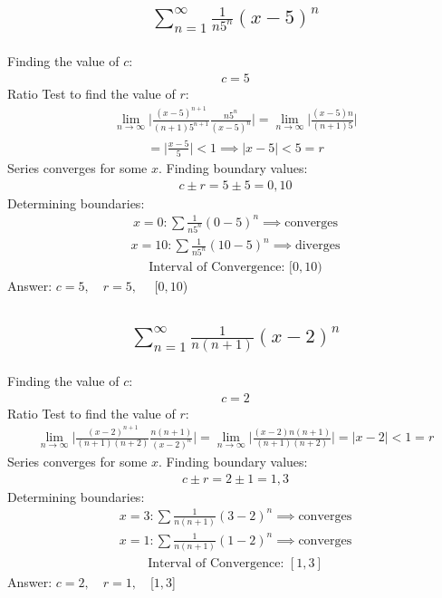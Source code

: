 \documentclass{article}
\begin{document}
\subsection{
	\begin{align*}
		\sum_{n = 1}^\infty \frac{1}{n 5^n} (x - 5)^n
	\end{align*}
}
Finding the value of $c$:
\begin{align*}
	c = 5
\end{align*}
Ratio Test to find the value of $r$:
\begin{align*}
	\lim_{n \to \infty} \bigg| \frac{(x - 5)^{n + 1}}{(n + 1) 5^{n + 1}} \frac{n 5^n}{(x - 5)^n} \bigg| = \lim_{n \to \infty} \bigg| \frac{(x - 5)n}{(n + 1)5} \bigg|
\end{align*}
\begin{align*}
	= \bigg| \frac{x - 5}{5} \bigg| < 1 \implies |x - 5| < 5 = r
\end{align*}
Series converges for some $x$. Finding boundary values:
\begin{align*}
	c \pm r = 5 \pm 5 = 0, 10
\end{align*}
Determining boundaries:
\begin{align*}
	x = 0: \sum \frac{1}{n 5^n} (0 - 5)^n \implies \text{converges}
\end{align*}
\begin{align*}
	x = 10: \sum \frac{1}{n 5^n} (10 - 5)^n \implies \text{diverges}
\end{align*}
\begin{align*}
	\text{Interval of Convergence: } [0, 10)
\end{align*}
Answer: $c = 5, \quad r = 5, \quad $ [$0, 10$)

\subsection{
	\begin{align*}
		\sum_{n = 1}^\infty \frac{1}{n(n + 1)} (x - 2)^n
	\end{align*}
}
Finding the value of $c$: 
\begin{align*}
	c = 2
\end{align*}
Ratio Test to find the value of $r$:
\begin{align*}
	\lim_{n \to \infty} \bigg| \frac{(x - 2)^{n + 1}}{(n + 1)(n + 2)} \frac{n(n + 1)}{(x - 2)^n} \bigg| = \lim_{n \to \infty} \bigg| \frac{(x - 2)n(n + 1)}{(n + 1)(n + 2)} \bigg| = | x - 2 | < 1 = r
\end{align*}
Series converges for some $x$. Finding boundary values:
\begin{align*}
	c \pm r = 2 \pm 1 = 1, 3
\end{align*}
Determining boundaries:
\begin{align*}
	x = 3: \sum \frac{1}{n(n + 1)} (3 - 2)^n \implies \text{converges}
\end{align*}
\begin{align*}
	x = 1: \sum \frac{1}{n(n + 1)} (1 - 2)^n \implies \text{converges}
\end{align*}
\begin{align*}
	\text{Interval of Convergence: } [1, 3]
\end{align*}
Answer: $c = 2, \quad r = 1, \quad $[$1,3$]
\end{document}

